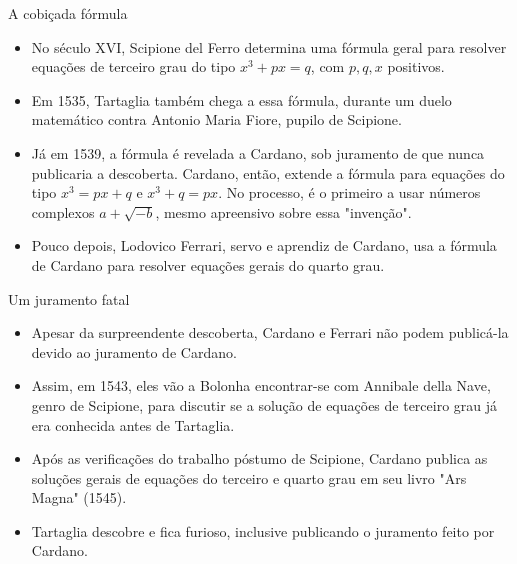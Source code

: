 \documentclass[article]{beamer}%
\begin{document}
\begin{frame}{A cobiçada fórmula}

\begin{itemize}[<+->]
    \item No século XVI, Scipione del Ferro determina uma fórmula geral para resolver equações de terceiro grau do tipo $x^3+px=q$, com $p,q,x$ positivos.

    \item Em 1535, Tartaglia também chega a essa fórmula, durante um duelo matemático contra Antonio Maria Fiore, pupilo de Scipione.

    \item Já em 1539, a fórmula é revelada a Cardano, sob juramento de que nunca publicaria a descoberta. Cardano, então, extende a fórmula para equações do tipo $x^3=px+q$ e $x^3+q=px$. No processo, é o primeiro a usar números complexos $a+\sqrt{-b}$, mesmo apreensivo sobre essa "invenção".

    \item Pouco depois, Lodovico Ferrari, servo e aprendiz de Cardano, usa a fórmula de Cardano para resolver equações gerais do quarto grau.
\end{itemize}

\end{frame}

\begin{frame}{Um juramento fatal}

\begin{itemize}[<+->]
    \item Apesar da surpreendente descoberta, Cardano e Ferrari não podem publicá-la devido ao juramento de Cardano.

    \item Assim, em 1543, eles vão a Bolonha encontrar-se com Annibale della Nave, genro de Scipione, para discutir se a solução de equações de terceiro grau já era conhecida antes de Tartaglia.

    \item Após as verificações do trabalho póstumo de Scipione, Cardano publica as soluções gerais de equações do terceiro e quarto grau em seu livro "Ars Magna" (1545).

    \item Tartaglia descobre e fica furioso, inclusive publicando o juramento feito por Cardano.
\end{itemize}

\end{frame}
\end{document}
